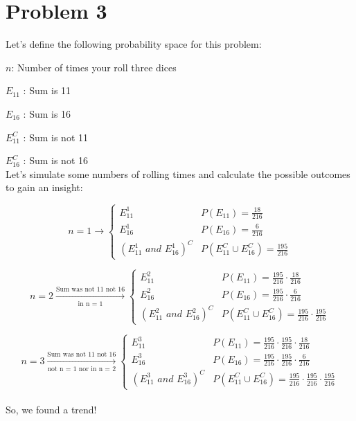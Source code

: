 	\newpage
	\section*{Problem 3}\label{sec:prob-3}
	Let's define the following probability space for this problem:
	
	$ n $: Number of times your roll three dices
	
	$ E_{11} $ : Sum is 11
	
	$ E_{16} $ : Sum is 16

	$ E_{11}^{C} $ : Sum is not 11
	
	$ E_{16}^{C} $ : Sum is not 16\\
		
	Let's simulate some numbers of rolling times and calculate the possible outcomes to gain an insight:
	
	\[
	n = 1 \rightarrow
	\begin{cases}
	E_{11}^{1}  & P(E_{11}) = \frac{18}{216}\\
	E_{16}^{1}  & P(E_{16}) = \frac{6}{216 }\\
	(E_{11}^{1} \textit{ and } E_{16}^{1})^{C}  & P(E_{11}^{C} \cup E_{16}^{C}) = \frac{195}{216 }
	\end{cases}
	\]

	\[
	n = 2 \xrightarrow[\text{in n = 1}]{\text{Sum was not 11 not 16}}
	\begin{cases}
	E_{11}^{2}  & P(E_{11}) = \frac{195}{216 } \cdot \frac{18}{216}  \\
	E_{16}^{2}  & P(E_{16}) = \frac{195}{216 } \cdot \frac{6}{216 } \\
	(E_{11}^{2} \textit{ and } E_{16}^{2})^{C} & P(E_{11}^{C} \cup E_{16}^{C}) = \frac{195}{216 } \cdot \frac{195}{216 }
	\end{cases}
	\]

	\[
	n = 3 \xrightarrow[\text{not n = 1 nor in n = 2}]{\text{Sum was not 11 not 16}}
	\begin{cases}
	E_{11}^{3}  & P(E_{11}) = \frac{195}{216 } \cdot \frac{195}{216 } \cdot \frac{18}{216}  \\
	E_{16}^{3}  & P(E_{16}) = \frac{195}{216 } \cdot \frac{195}{216 } \cdot \frac{6}{216 } \\
	(E_{11}^{3} \textit{ and } E_{16}^{3})^{C} & P(E_{11}^{C} \cup E_{16}^{C}) = \frac{195}{216 } \cdot \frac{195}{216 } \cdot \frac{195}{216 }
	\end{cases}
	\]\\
	
	So, we found a trend!
	
